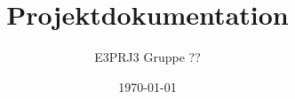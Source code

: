 \documentclass[a4paper,11pt,fleqn,dvipsnames,oneside,openright]{memoir} 	%
\title{Projektdokumentation}
\author{E3PRJ3 Gruppe ??}
\date{\today{} \currenttime{}}
\begin{document}

\frontmatter

\clearpage


\clearpage
\tableofcontents*

\mainmatter






%

\end{document}
